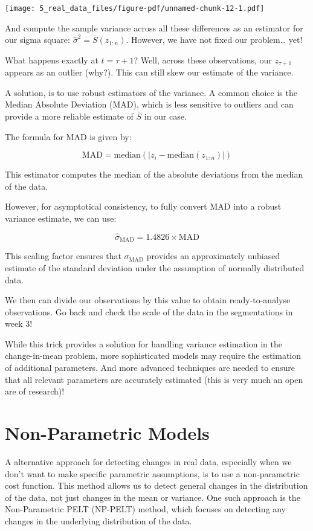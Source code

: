 \documentclass[
  letterpaper,
  DIV=11,
  numbers=noendperiod]{scrreprt}
\begin{document}
\texttt{[image: 5\_real\_data\_files/figure-pdf/unnamed-chunk-12-1.pdf]}

And compute the sample variance across all these differences as an
estimator for our sigma square: \(\hat \sigma^2 = \bar S(z_{1:n})\).
However, we have not fixed our problem\ldots{} yet!

What happens exactly at \(t = \tau +1\)? Well, across these
observations, our \(z_{\tau + 1}\) appears as an outlier (why?). This
can still skew our estimate of the variance.

A solution, is to use robust estimators of the variance. A common choice
is the Median Absolute Deviation (MAD), which is less sensitive to
outliers and can provide a more reliable estimate of \(\bar S\) in our
case.

The formula for MAD is given by:

\[
\text{MAD} = \text{median}(|z_i - \text{median}(z_{1:n})|)
\]

This estimator computes the median of the absolute deviations from the
median of the data.

However, for asymptotical consistency, to fully convert MAD into a
robust variance estimate, we can use:

\[
\hat \sigma_{\text{MAD}} = 1.4826 \times \text{MAD}
\]

This scaling factor ensures that \(\sigma_{\text{MAD}}\) provides an
approximately unbiased estimate of the standard deviation under the
assumption of normally distributed data.

We then can divide our observations by this value to obtain
ready-to-analyse observations. Go back and check the scale of the data
in the segmentations in week 3!

While this trick provides a solution for handling variance estimation in
the change-in-mean problem, more sophisticated models may require the
estimation of additional parameters. And more advanced techniques are
needed to ensure that all relevant parameters are accurately estimated
(this is very much an open are of research)!

\section{Non-Parametric Models}\label{non-parametric-models}

A alternative approach for detecting changes in real data, especially
when we don't want to make specific parametric assumptions, is to use a
non-parametric cost function. This method allows us to detect general
changes in the distribution of the data, not just changes in the mean or
variance. One such approach is the Non-Parametric PELT (NP-PELT) method,
which focuses on detecting any changes in the underlying distribution of
the data.
\end{document}
